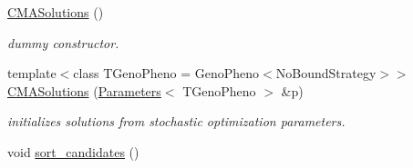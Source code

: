 \begin{DoxyCompactItemize}
\item 
\hypertarget{classlibcmaes_1_1CMASolutions_adc7194ca66777833c1980d11bc79649b}{\hyperlink{classlibcmaes_1_1CMASolutions_adc7194ca66777833c1980d11bc79649b}{C\-M\-A\-Solutions} ()}\label{classlibcmaes_1_1CMASolutions_adc7194ca66777833c1980d11bc79649b}

\begin{DoxyCompactList}\small\item\em dummy constructor. \end{DoxyCompactList}\item 
{\footnotesize template$<$class T\-Geno\-Pheno  = Geno\-Pheno$<$\-No\-Bound\-Strategy$>$$>$ }\\\hyperlink{classlibcmaes_1_1CMASolutions_acb424e8b0329ee8790be4156aef68c4f}{C\-M\-A\-Solutions} (\hyperlink{classlibcmaes_1_1Parameters}{Parameters}$<$ T\-Geno\-Pheno $>$ \&p)
\begin{DoxyCompactList}\small\item\em initializes solutions from stochastic optimization parameters. \end{DoxyCompactList}\item 
\hypertarget{classlibcmaes_1_1CMASolutions_a48934296b4295080786cbc97302448f7}{void \hyperlink{classlibcmaes_1_1CMASolutions_a48934296b4295080786cbc97302448f7}{sort\-\_\-candidates} ()}\label{classlibcmaes_1_1CMASolutions_a48934296b4295080786cbc97302448f7}


\end{DoxyCompactItemize}
